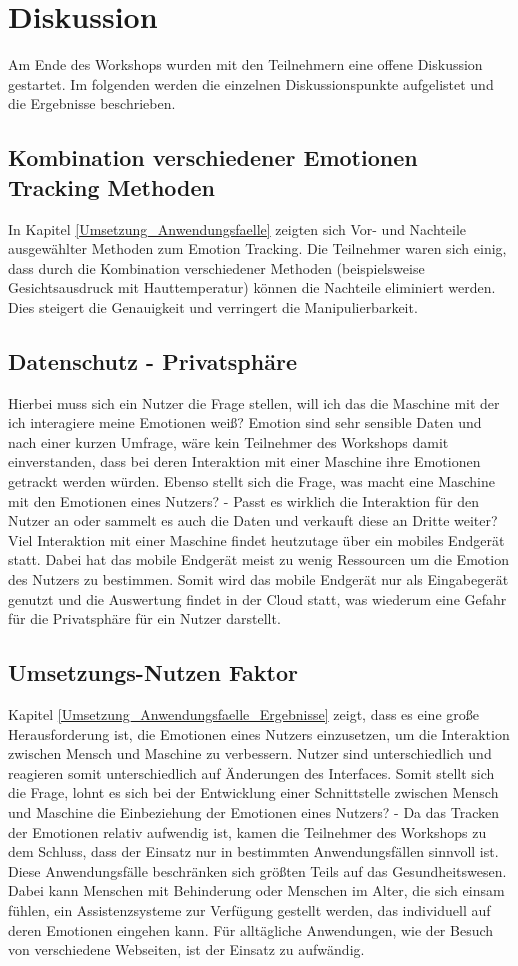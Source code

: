 \section{Diskussion}
Am Ende des Workshops wurden mit den Teilnehmern eine offene Diskussion gestartet. Im folgenden werden die einzelnen Diskussionspunkte aufgelistet und die Ergebnisse beschrieben.

\subsection{Kombination verschiedener Emotionen Tracking Methoden}
In Kapitel \ref{Umsetzung_Anwendungsfaelle} zeigten sich Vor- und Nachteile ausgewählter Methoden zum Emotion Tracking. Die Teilnehmer waren sich einig, dass durch die Kombination verschiedener Methoden (beispielsweise Gesichtsausdruck mit Hauttemperatur) können die Nachteile eliminiert werden. Dies steigert die Genauigkeit und verringert die Manipulierbarkeit.

\subsection{Datenschutz - Privatsphäre}
Hierbei muss sich ein Nutzer die Frage stellen, will ich das die Maschine mit der ich interagiere meine Emotionen weiß? Emotion sind sehr sensible Daten und nach einer kurzen Umfrage, wäre kein Teilnehmer des Workshops damit einverstanden, dass bei deren Interaktion mit einer Maschine ihre Emotionen getrackt werden würden. Ebenso stellt sich die Frage, was macht eine Maschine mit den Emotionen eines Nutzers? - Passt es wirklich die Interaktion für den Nutzer an oder sammelt es auch die Daten und verkauft diese an Dritte weiter? Viel Interaktion mit einer Maschine findet heutzutage über ein mobiles Endgerät statt. Dabei hat das mobile Endgerät meist zu wenig Ressourcen um die Emotion des Nutzers zu bestimmen. Somit wird das mobile Endgerät nur als Eingabegerät genutzt und die Auswertung findet in der Cloud statt, was wiederum eine Gefahr für die Privatsphäre für ein Nutzer darstellt.

\subsection{Umsetzungs-Nutzen Faktor}
Kapitel \ref{Umsetzung_Anwendungsfaelle_Ergebnisse} zeigt, dass es eine große Herausforderung ist, die Emotionen eines Nutzers einzusetzen, um die Interaktion zwischen Mensch und Maschine zu verbessern. Nutzer sind unterschiedlich und reagieren somit unterschiedlich auf Änderungen des Interfaces. Somit stellt sich die Frage, lohnt es sich bei der Entwicklung einer Schnittstelle zwischen Mensch und Maschine die Einbeziehung der Emotionen eines Nutzers? -  Da das Tracken der Emotionen relativ aufwendig ist, kamen die Teilnehmer des Workshops zu dem Schluss, dass der Einsatz nur in bestimmten Anwendungsfällen sinnvoll ist. Diese Anwendungsfälle beschränken sich größten Teils auf das Gesundheitswesen. Dabei kann Menschen mit Behinderung oder Menschen im Alter, die sich einsam fühlen, ein Assistenzsysteme zur Verfügung gestellt werden, das individuell auf deren Emotionen eingehen kann. Für alltägliche Anwendungen, wie der Besuch von verschiedene Webseiten, ist der Einsatz zu aufwändig.